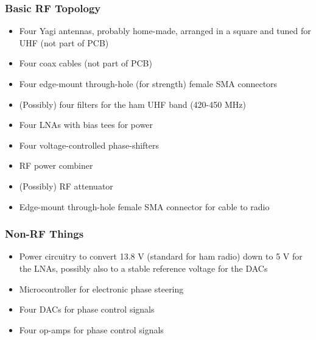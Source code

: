 \documentclass{beamer}
\begin{document}
    \begin{frame}
        \frametitle{Basic RF Topology}
        \begin{itemize}
            \item Four Yagi antennas, probably home-made, arranged in a square and tuned for UHF (not part of PCB)

            \item Four coax cables (not part of PCB)

            \item Four edge-mount through-hole (for strength) female SMA connectors

            \item (Possibly) four filters for the ham UHF band (420-450 MHz)

            \item Four LNAs with bias tees for power

            \item Four voltage-controlled phase-shifters

            \item RF power combiner

            \item (Possibly) RF attenuator

            \item Edge-mount through-hole female SMA connector for cable to radio
        \end{itemize}
    \end{frame}

    \begin{frame}
        \frametitle{Non-RF Things}
        \begin{itemize}
            \item Power circuitry to convert 13.8 V (standard for ham radio) down to 5 V for the LNAs, possibly also to a stable reference voltage for the DACs

            \item Microcontroller for electronic phase steering

            \item Four DACs for phase control signals

            \item Four op-amps for phase control signals
        \end{itemize}
    \end{frame}
\end{document}
